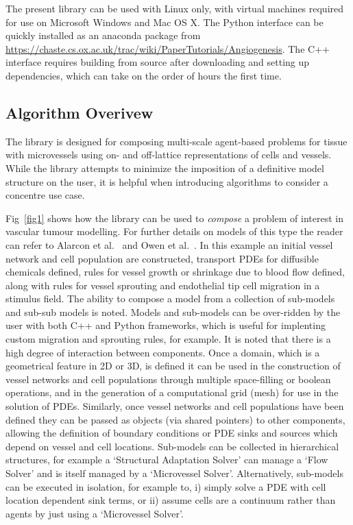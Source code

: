 \documentclass[10pt,letterpaper]{article}
\begin{document}
The present library can be used with Linux only, with virtual machines required for use on Microsoft Windows and Mac OS X. The Python interface can be quickly installed as an anaconda package from \url{https://chaste.cs.ox.ac.uk/trac/wiki/PaperTutorials/Angiogenesis}. The C++ interface requires building from source after downloading and setting up dependencies, which can take on the order of hours the first time.

\subsection*{Algorithm Overivew}

The library is designed for composing multi-scale agent-based problems for tissue with microvessels using on- and off-lattice representations of cells and vessels. While the library attempts to minimize the imposition of a definitive model structure on the user, it is helpful when introducing algorithms to consider a concentre use case. 

Fig~\ref{fig1} shows how the library can be used to \emph{compose} a problem of interest in vascular tumour modelling. For further details on models of this type the reader can refer to Alarcon et al.~\cite{Alarcon2005} and Owen et al.~\cite{Owen2011}. In this example an initial vessel network and cell population are constructed, transport PDEs for diffusible chemicals defined, rules for vessel growth or shrinkage due to blood flow defined, along with rules for vessel sprouting and endothelial tip cell migration in a stimulus field. The ability to compose a model from a collection of sub-models and sub-sub models is noted. Models and sub-models can be over-ridden by the user with both C++ and Python frameworks, which is useful for implenting custom migration and sprouting rules, for example. It is noted that there is a high degree of interaction between components. Once a domain, which is a geometrical feature in 2D or 3D, is defined it can be used in the construction of vessel networks and cell populations through multiple space-filling or boolean operations, and in the generation of a computational grid (mesh) for use in the solution of PDEs. Similarly, once vessel networks and cell populations have been defined they can be passed as objects (via shared pointers) to other components, allowing the definition of boundary conditions or PDE sinks and sources which depend on vessel and cell locations. Sub-models can be collected in hierarchical structures, for example a `Structural Adaptation Solver' can manage a `Flow Solver' and is itself managed by a `Microvessel Solver'. Alternatively, sub-models can be executed in isolation, for example to, i) simply solve a PDE with cell location dependent sink terms, or ii) assume cells are a continuum rather than agents by just using a `Microvessel Solver'.
\end{document}
